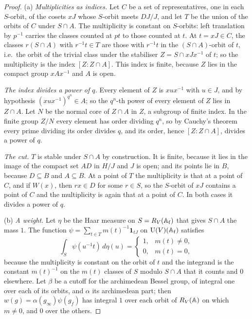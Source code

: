 \begin{proof}
(a) \emph{Multiplicities as indices.} Let $C$ be a set of representatives, one in each $S$-orbit, of the cosets $xJ$ whose $S$-orbit meets $DJ/J$, and let $T$ be the union of the orbits of $C$ under $S\cap A$. The multiplicity is constant on $S$-orbits: left translation by $p^{-1}$ carries the classes counted at $pt$ to those counted at $t$. At
$t=xJ\in C$, the classes $r(S\cap A)$ with $r^{-1}t\in T$ are those with $r^{-1}t$ in the $(S\cap A)$-orbit of $t$, i.e.\ the orbit of the trivial class under the stabiliser $Z=S\cap xJx^{-1}$ of $t$; so the multiplicity is the index $[Z:Z\cap A]$. This index is finite, because $Z$ lies in the compact group $xAx^{-1}$ and $A$ is
open.

\emph{The index divides a power of $q$.} Every element of $Z$ is $xux^{-1}$ with $u\in J$, and by hypothesis $(xux^{-1})^{q^n}\in A$; so the $q^n$-th power of every element of $Z$ lies in $Z\cap A$. Let $N$ be the normal core of $Z\cap A$ in $Z$, a subgroup of finite index. In the finite group $Z/N$ every element has order dividing $q^n$, so
by Cauchy's theorem every prime dividing its order divides $q$, and its order, hence $[Z:Z\cap A]$, divides a power of $q$.

\emph{The cut.} $T$ is stable under $S\cap A$ by construction. It is finite, because it lies in the image of the compact set $AD$ in $H/J$ and $J$ is open; and its points lie in $B$, because $D\subseteq B$ and $A\subseteq B$. At a point of $T$ the multiplicity is that at a point of $C$, and if $W(x)$, then $rx\in D$ for some $r\in S$, so the
$S$-orbit of $xJ$ contains a point of $C$ and the multiplicity is again that at a point of $C$. In both cases it divides a power of $q$.

(b) \emph{A weight.} Let $\eta$ be the Haar measure on $S=R_V(\mathbb{A}_{\mathrm f})$ that gives $S\cap A$ the mass $1$. The function $\psi=\sum_{t\in T}m(t)^{-1}\mathbf1_{tJ}$ on $\operatorname{U}(V)(\mathbb{A}_{\mathrm f})$ satisfies
\[
  \int_S\psi(u^{-1}t)\,d\eta(u)=\begin{cases}1,&m(t)\ne0,\\0,&m(t)=0,\end{cases}
\]
because the multiplicity is constant on the orbit of $t$ and the integrand is the constant $m(t)^{-1}$ on the $m(t)$ classes of $S$ modulo $S\cap A$ that it counts and $0$ elsewhere. Let $\beta$ be a cutoff for the archimedean Bessel group, of integral one over each of its orbits, and $\alpha$ its archimedean part; then $w(g)=\alpha(g_\infty)\psi(g_f)$
has integral $1$ over each orbit of $R_V(\mathbb{A})$ on which $m\ne0$, and $0$ over the others.


\end{proof}
